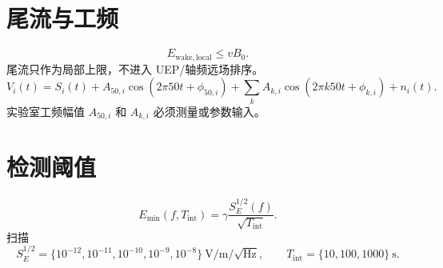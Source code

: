 \documentclass[UTF8,a4paper,11pt]{ctexart}
\begin{document}
\section{尾流与工频}
\[
E_{\mathrm{wake,local}}\le vB_0.
\]
尾流只作为局部上限，不进入 UEP/轴频远场排序。
\[
V_i(t)=S_i(t)+A_{50,i}\cos(2\pi50t+\phi_{50,i})
+\sum_k A_{k,i}\cos(2\pi k50t+\phi_{k,i})+n_i(t).
\]
实验室工频幅值 $A_{50,i}$ 和 $A_{k,i}$ 必须测量或参数输入。

\section{检测阈值}
\[
E_{\min}(f,T_{\mathrm{int}})
=\gamma\frac{S_E^{1/2}(f)}{\sqrt{T_{\mathrm{int}}}}.
\]
扫描
\[
S_E^{1/2}=\{10^{-12},10^{-11},10^{-10},10^{-9},10^{-8}\}\ \mathrm{V/m/\sqrt{Hz}},
\qquad
T_{\mathrm{int}}=\{10,100,1000\}\ \mathrm{s}.
\]
\end{document}
